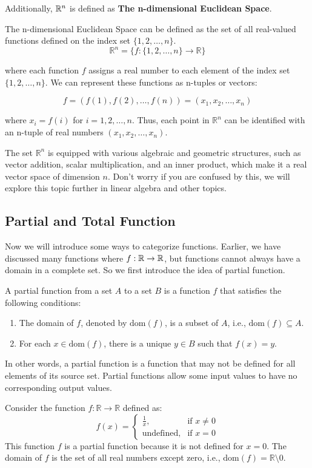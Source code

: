 		Additionally, $\mathbb{R}^n$ is defined as \textbf{The n-dimensional Euclidean Space}.
		\begin{definition}
		The n-dimensional Euclidean Space can be defined as the set of all real-valued functions defined on the index set $\{1, 2, \ldots, n\}$.
			\[\mathbb{R}^n = \{f \colon \{1, 2, \ldots, n\} \to \mathbb{R}\}\]
			
			where each function $f$ assigns a real number to each element of the index set $\{1, 2, \ldots, n\}$. We can represent these functions as n-tuples or vectors:
			
			\[f = (f(1), f(2), \ldots, f(n)) = (x_1, x_2, \ldots, x_n)\]
			
			where $x_i = f(i)$ for $i = 1, 2, \ldots, n$. Thus, each point in $\mathbb{R}^n$ can be identified with an n-tuple of real numbers $(x_1, x_2, \ldots, x_n)$.
			
			The set $\mathbb{R}^n$ is equipped with various algebraic and geometric structures, such as vector addition, scalar multiplication, and an inner product, which make it a real vector space of dimension $n$. Don't worry if you are confused by this, we will explore this topic further in linear algebra and other topics.
		\end{definition}
		
\subsection{Partial and Total Function}
Now we will introduce some ways to categorize functions. Earlier, we have discussed many functions where $f: \mathbb{R} \to \mathbb{R}$, but functions cannot always 
have a domain in a complete set. So we first introduce the idea of partial function.
\begin{definition}
	A partial function from a set $A$ to a set $B$ is a function $f$ that satisfies the following conditions:
	\begin{enumerate}
		\item The domain of $f$, denoted by $\text{dom}(f)$, is a subset of $A$, i.e., $\text{dom}(f) \subseteq A$.
		\item For each $x \in \text{dom}(f)$, there is a unique $y \in B$ such that $f(x) = y$.
	\end{enumerate}
	
	In other words, a partial function is a function that may not be defined for all elements of its source set. Partial functions allow some input values to have no corresponding output values.
\end{definition}
\begin{example}
	Consider the function $f: \mathbb{R} \to \mathbb{R}$ defined as:
	$$
	f(x) = \begin{cases}
		\frac{1}{x}, & \text{if } x \neq 0 \\
		\text{undefined}, & \text{if } x = 0
	\end{cases}
	$$
	This function $f$ is a partial function because it is not defined for $x = 0$. The domain of $f$ is the set of all real numbers except zero, i.e., $\text{dom}(f) = \mathbb{R} \setminus {0}$.
\end{example}

